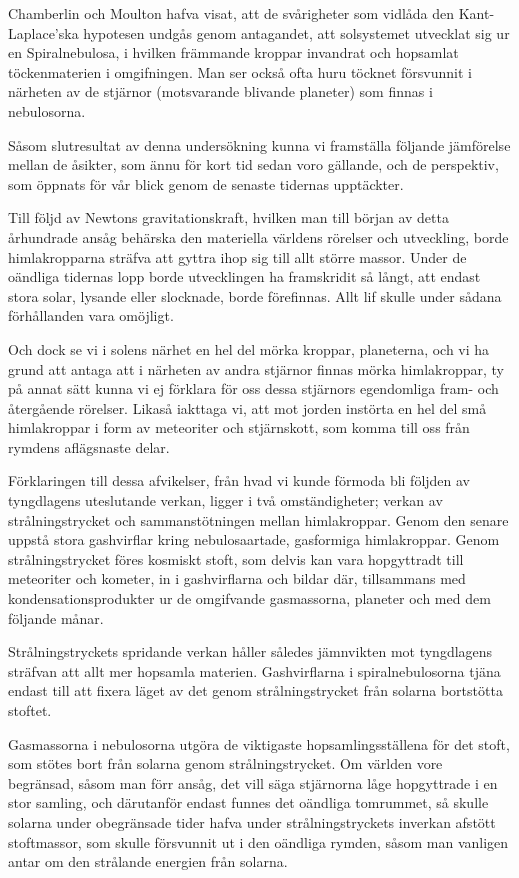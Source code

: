 \documentclass[a4paper, 12pt, oneside, swedish]{article}
\begin{document}
Chamberlin och Moulton hafva visat, att de svårigheter som vidlåda den Kant-Laplace'ska hypotesen undgås genom antagandet, att solsystemet utvecklat sig ur en Spiralnebulosa, i hvilken främmande kroppar invandrat och hopsamlat töckenmaterien i omgifningen. Man ser också ofta huru töcknet försvunnit i närheten av de stjärnor (motsvarande blivande planeter) som finnas i nebulosorna.

Såsom slutresultat av denna undersökning kunna vi framställa följande jämförelse mellan de åsikter, som ännu för kort tid sedan voro gällande, och de perspektiv, som öppnats för vår blick genom de senaste tidernas upptäckter.

Till följd av Newtons gravitationskraft, hvilken man till början av detta århundrade ansåg behärska den materiella världens rörelser och utveckling, borde himlakropparna sträfva att gyttra ihop sig till allt större massor. Under de oändliga tidernas lopp borde utvecklingen ha framskridit så långt, att endast stora solar, lysande eller slocknade, borde förefinnas. Allt lif skulle under sådana förhållanden vara omöjligt.

Och dock se vi i solens närhet en hel del mörka kroppar, planeterna, och vi ha grund att antaga att i närheten av andra stjärnor finnas mörka himlakroppar, ty på annat sätt kunna vi ej förklara för oss dessa stjärnors egendomliga fram- och återgående rörelser. Likaså iakttaga vi, att mot jorden instörta en hel del små himlakroppar i form av meteoriter och stjärnskott, som komma till oss från rymdens aflägsnaste delar.

Förklaringen till dessa afvikelser, från hvad vi kunde förmoda bli följden av tyngdlagens uteslutande verkan, ligger i två omständigheter; verkan av strålningstrycket och sammanstötningen mellan himlakroppar. Genom den senare uppstå stora gashvirflar kring nebulosaartade, gasformiga himlakroppar. Genom strålningstrycket föres kosmiskt stoft, som delvis kan vara hopgyttradt till meteoriter och kometer, in i gashvirflarna och bildar där, tillsammans med kondensationsprodukter ur de omgifvande gasmassorna, planeter och med dem följande månar.

Strålningstryckets spridande verkan håller således jämnvikten mot tyngdlagens sträfvan att allt mer hopsamla materien. Gashvirflarna i spiralnebulosorna tjäna endast till att fixera läget av det genom strålningstrycket från solarna bortstötta stoftet.

Gasmassorna i nebulosorna utgöra de viktigaste hopsamlingsställena för det stoft, som stötes bort från solarna genom strålningstrycket. Om världen vore begränsad, såsom man förr ansåg, det vill säga stjärnorna låge hopgyttrade i en stor samling, och därutanför endast funnes det oändliga tomrummet, så skulle solarna under obegränsade tider hafva under strålningstryckets inverkan afstött stoftmassor, som skulle försvunnit ut i den oändliga rymden, såsom man vanligen antar om den strålande energien från solarna.
\end{document}
